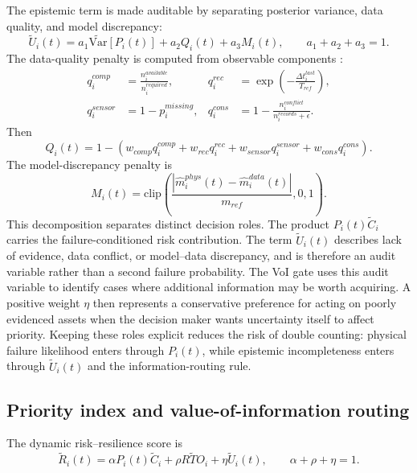 \documentclass[cmes,article,submit,moreauthors,pdftex]{Definitions/tsp}
\begin{document}
The epistemic term is made auditable by separating posterior variance, data quality, and model discrepancy:
\begin{equation}
\widetilde{U}_i(t)=
a_1 \widetilde{\mathrm{Var}}[P_i(t)] + a_2 Q_i(t) + a_3 M_i(t),
\qquad a_1+a_2+a_3=1.
\end{equation}
The data-quality penalty is computed from observable components \cite{derkiureghian2009,helton2006,saltelli2010}:
\begin{align}
q_i^{comp} &= \frac{n_i^{available}}{n_i^{required}}, &
q_i^{rec} &= \exp\left(-\frac{\Delta t_i^{last}}{T_{ref}}\right),\\
q_i^{sensor} &= 1-p_i^{missing}, &
q_i^{cons} &= 1-\frac{n_i^{conflict}}{n_i^{records}+\epsilon}.
\end{align}
Then
\begin{equation}
Q_i(t)=1-\left(w_{comp}q_i^{comp}+w_{rec}q_i^{rec}
+w_{sensor}q_i^{sensor}+w_{cons}q_i^{cons}\right).
\end{equation}
The model-discrepancy penalty is
\begin{equation}
M_i(t)=\mathrm{clip}\left(\frac{|\widehat{m}_i^{phys}(t)-\widehat{m}_i^{data}(t)|}{m_{ref}},0,1\right).
\end{equation}
This decomposition separates distinct decision roles. The product $P_i(t)\widetilde{C}_i$ carries the failure-conditioned risk contribution. The term $\widetilde{U}_i(t)$ describes lack of evidence, data conflict, or model--data discrepancy, and is therefore an audit variable rather than a second failure probability. The VoI gate uses this audit variable to identify cases where additional information may be worth acquiring. A positive weight $\eta$ then represents a conservative preference for acting on poorly evidenced assets when the decision maker wants uncertainty itself to affect priority. Keeping these roles explicit reduces the risk of double counting: physical failure likelihood enters through $P_i(t)$, while epistemic incompleteness enters through $\widetilde{U}_i(t)$ and the information-routing rule.

\subsection{Priority index and value-of-information routing}

The dynamic risk--resilience score is
\begin{equation}
\widetilde{R}_i(t)=
\alpha P_i(t)\widetilde{C}_i + \rho \widetilde{RTO}_i + \eta \widetilde{U}_i(t),
\qquad \alpha+\rho+\eta=1.
\label{eq:score}
\end{equation}
\end{document}
